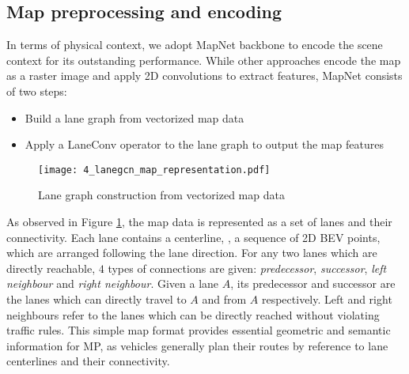 \subsection{Map preprocessing and encoding}
\label{subsec:4_improving_efficiency_map_preprocessing_and_encoding}

In terms of physical context, we adopt MapNet \cite{liang2020learning} backbone to encode the scene context for its outstanding performance. %
While other approaches encode the map as a raster image and apply 2D convolutions to extract features, MapNet consists of two steps:

\begin{itemize}
	\item Build a lane graph from vectorized map data
	\item Apply a LaneConv operator to the lane graph to output the map features
\end{itemize}

\begin{figure}[h] 
	\centering
	\texttt{[image: 4\_lanegcn\_map\_representation.pdf]}
	\caption{Lane graph construction from vectorized map data}
	\label{fig:4_improving_efficiency_lanegcn_map_representation}
\end{figure}

As observed in Figure \ref{fig:4_improving_efficiency_lanegcn_map_representation}, the map data is represented as a set of lanes and their connectivity. Each lane contains a centerline, \ie, a sequence of 2D BEV points, which are arranged following the lane direction. For any two lanes which are directly reachable, $4$ types of connections are given: \textit{predecessor}, \textit{successor}, \textit{left neighbour} and \textit{right neighbour}. Given a lane $A$, its predecessor and successor are the lanes which can directly travel to $A$ and from $A$ respectively. Left and right neighbours refer to the  lanes which can be directly reached without violating traffic rules. This simple map format provides essential geometric and semantic information for \ac{MP}, as vehicles generally plan their routes by reference to lane centerlines and their connectivity. 

